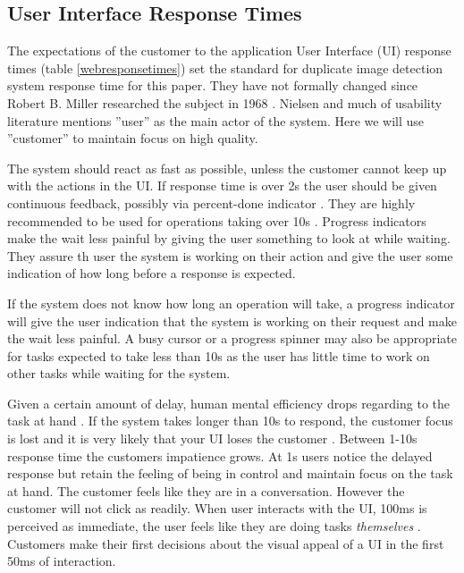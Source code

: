 \documentclass[english,12pt,a4paper,pdftex,elec,utf8]{aaltothesis}
\begin{document}
\subsection{User Interface Response Times}
The expectations of the customer to the application User Interface (UI) response times (table \ref{webresponsetimes}) set the standard for duplicate image detection system response time for this paper. They have not formally changed since Robert B. Miller researched the subject in 1968 \cite{Nielsen1993}. Nielsen and much of usability literature mentions ''user'' as the main actor of the system. Here we will use ''customer'' to maintain focus on high quality.

The system should react as fast as possible, unless the customer cannot keep up with the actions in the UI. If response time is over 2s the user should be given continuous feedback, possibly via percent-done indicator \cite{Myers1985}. They are highly recommended to be used for operations taking over 10s \cite{Nielsen1993}. Progress indicators make the wait less painful by giving the user something to look at while waiting. They assure th user the system is working on their action and give the user some indication of how long before a response is expected. \cite{Nielsen1993a}

If the system does not know how long an operation will take, a progress indicator will give the user indication that the system is working on their request and make the wait less painful. A busy cursor or a progress spinner may also be appropriate for tasks expected to take less than 10s as the user has little time to work on other tasks while waiting for the system. \cite{Nielsen1993a}

Given a certain amount of delay, human mental efficiency drops regarding to the task at hand \cite{Miller1968}. If the system takes longer than 10s to respond, the customer focus is lost and it is very likely that your UI loses the customer \cite{Nielsen1993a}. Between 1-10s response time the customers impatience grows. At 1s users notice the delayed response but retain the feeling of being in control and maintain focus on the task at hand. The customer feels like they are in a conversation. However the customer will not click as readily. When user interacts with the UI, 100ms is perceived as immediate, the user feels like they are doing tasks \emph{themselves} \cite{Nielsen2010}. Customers make their first decisions about the visual appeal of a UI in the first 50ms of interaction. \cite{Nielsen2010}
\end{document}
